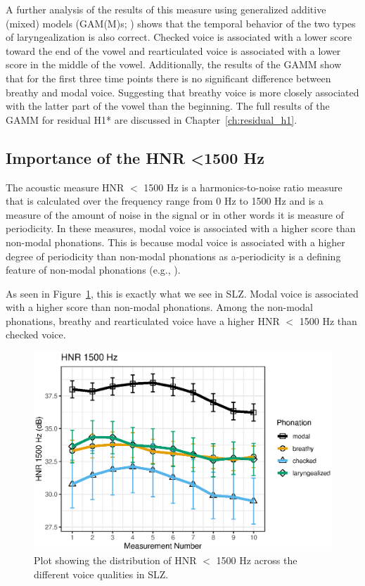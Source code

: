 A further analysis of the results of this measure using generalized additive (mixed) models (GAM(M)s; \cite{hastieGeneralizedAdditiveModels1986,woodGeneralizedAdditiveModels2017,soskuthyGeneralisedAdditiveMixed2017,wielingAnalyzingDynamicPhonetic2018}) shows that the temporal behavior of the two types of laryngealization is also correct. Checked voice is associated with a lower score toward the end of the vowel and rearticulated voice is associated with a lower score in the middle of the vowel. Additionally, the results of the GAMM show that for the first three time points there is no significant difference between breathy and modal voice. Suggesting that breathy voice is more closely associated with the latter part of the vowel than the beginning. The full results of the GAMM for residual H1* are discussed in Chapter~\ref{ch:residual_h1}.

\subsection{Importance of the HNR \textless 1500 Hz} \label{sec:bagging_hnr}

The acoustic measure HNR $<$ 1500 Hz is a harmonics-to-noise ratio measure that is calculated over the frequency range from 0 Hz to 1500 Hz and is a measure of the amount of noise in the signal or in other words it is measure of periodicity. In these measures, modal voice is associated with a higher score than non-modal phonations. This is because modal voice is associated with a higher degree of periodicity than non-modal phonations as a-periodicity is a defining feature of non-modal phonations (e.g., \cite{hillenbrandAcousticCorrelatesBreathy1996,blankenshipTimeCourseBreathiness1997,kentVoiceQualityMeasurement1999}).

As seen in Figure~\ref{fig:hnr1500}, this is exactly what we see in SLZ. Modal voice is associated with a higher score than non-modal phonations. Among the non-modal phonations, breathy and rearticulated voice have a higher HNR $<$ 1500 Hz than checked voice. 

\begin{figure}[h!]
    \centering
    \includegraphics[width = 0.9\linewidth]{images/slz_hnr15.eps}
    \caption{Plot showing the distribution of HNR $<$ 1500 Hz across the different voice qualities in SLZ.}
    \label{fig:hnr1500}
\end{figure}

